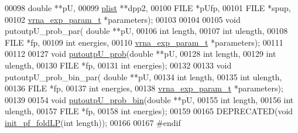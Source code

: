 \begin{DoxyCode}
00098                     \textcolor{keywordtype}{double} **pU,
00099                     \hyperlink{group__data__structures_structvrna__plist__s}{plist} **dpp2,
00100                     FILE *pUfp,
00101                     FILE *spup,
00102                     \hyperlink{group__energy__parameters_structvrna__exp__param__s}{vrna\_exp\_param\_t} *parameters);
00103 
00104 
00105 \textcolor{keywordtype}{void} putoutpU\_prob\_par( \textcolor{keywordtype}{double} **pU,
00106                         \textcolor{keywordtype}{int} length,
00107                         \textcolor{keywordtype}{int} ulength,
00108                         FILE *fp,
00109                         \textcolor{keywordtype}{int} energies,
00110                         \hyperlink{group__energy__parameters_structvrna__exp__param__s}{vrna\_exp\_param\_t} *parameters);
00111 
00112 
00127 \textcolor{keywordtype}{void}    \hyperlink{group__local__pf__fold_ga0bcb751860bbf34e3dfee8c2fbdb3ef3}{putoutpU\_prob}(\textcolor{keywordtype}{double} **pU,
00128                       \textcolor{keywordtype}{int} length,
00129                       \textcolor{keywordtype}{int} ulength,
00130                       FILE *fp,
00131                       \textcolor{keywordtype}{int} energies);
00132 
00133 \textcolor{keywordtype}{void} putoutpU\_prob\_bin\_par( \textcolor{keywordtype}{double} **pU,
00134                             \textcolor{keywordtype}{int} length,
00135                             \textcolor{keywordtype}{int} ulength,
00136                             FILE *fp,
00137                             \textcolor{keywordtype}{int} energies,
00138                             \hyperlink{group__energy__parameters_structvrna__exp__param__s}{vrna\_exp\_param\_t} *parameters);
00139 
00154 \textcolor{keywordtype}{void}    \hyperlink{group__local__pf__fold_ga9acb00ee10e96b1ca4ea394cd8bcec75}{putoutpU\_prob\_bin}(\textcolor{keywordtype}{double} **pU,
00155                           \textcolor{keywordtype}{int} length,
00156                           \textcolor{keywordtype}{int} ulength,
00157                           FILE *fp,
00158                           \textcolor{keywordtype}{int} energies);
00159 
00165 DEPRECATED(\textcolor{keywordtype}{void} \hyperlink{LPfold_8h_ae85bf55053e9fb295208be322e0fa07a}{init\_pf\_foldLP}(\textcolor{keywordtype}{int} length));
00166 
00167 \textcolor{preprocessor}{#endif}
\end{DoxyCode}
